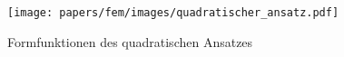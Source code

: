 %
%
%
\begin{figure}
    \centering
    \texttt{[image: papers/fem/images/quadratischer\_ansatz.pdf]}
    \caption{Formfunktionen des quadratischen Ansatzes}
    \label{fem:1d:abb:quadratisch}
    \end{figure}
    